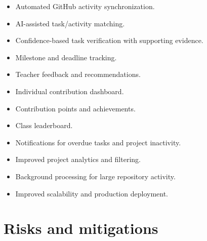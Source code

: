 \documentclass[11pt,a4paper]{article}
\begin{document}
\begin{itemize}[leftmargin=0.7cm]

    \item Automated GitHub activity synchronization.

    \item AI-assisted task/activity matching.

    \item Confidence-based task verification with supporting evidence.

    \item Milestone and deadline tracking.

    \item Teacher feedback and recommendations.

    \item Individual contribution dashboard.

    \item Contribution points and achievements.

    \item Class leaderboard.

    \item Notifications for overdue tasks and project inactivity.

    \item Improved project analytics and filtering.

    \item Background processing for large repository activity.

    \item Improved scalability and production deployment.

\end{itemize}


\section{Risks and mitigations}
\end{document}
